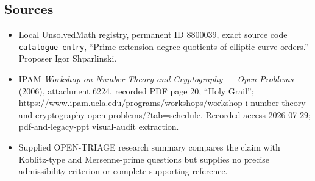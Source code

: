 \documentclass[11pt]{article}
\begin{document}
\subsection{Sources}
\begin{itemize}
\item Local UnsolvedMath registry, permanent ID \(8800039\), exact source code \texttt{catalogue entry}, ``Prime extension-degree quotients of elliptic-curve orders.'' Proposer Igor Shparlinski.
\item IPAM \emph{Workshop on Number Theory and Cryptography --- Open Problems} (2006), attachment 6224, recorded PDF page 20, ``Holy Grail''; \url{https://www.ipam.ucla.edu/programs/workshops/workshop-i-number-theory-and-cryptography-open-problems/?tab=schedule}. Recorded access 2026-07-29; pdf-and-legacy-ppt visual-audit extraction.
\item Supplied OPEN-TRIAGE research summary compares the claim with Koblitz-type and Mersenne-prime questions but supplies no precise admissibility criterion or complete supporting reference.
\end{itemize}
\end{document}

